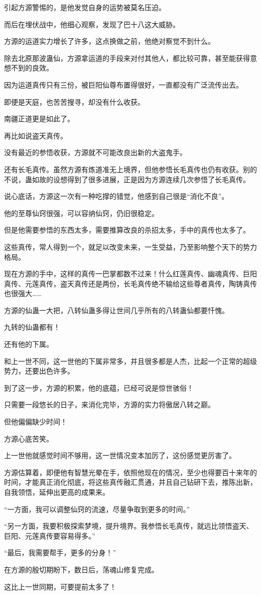 \begin{this_body}
引起方源警惕的，是他发觉自身的运势被莫名压迫。

而后在埋伏战中，他细心观察，发现了巴十八这大威胁。

方源的运道实力增长了许多，这点换做之前，他绝对察觉不到什么。

除去北原那波蛊仙，方源拿运道的手段来对付其他人，都比较可靠，甚至能获得意想不到的良效。

因为运道真传只有三份，被巨阳仙尊布置得很好，一直都没有广泛流传出去。

即便是天庭，也苦苦搜寻，却没有什么收获。

南疆正道更是如此了。

再比如说盗天真传。

没有最近的参悟收获，方源就不可能改良出新的大盗鬼手。

还有长毛真传。虽然方源有炼道准无上境界，但他参悟长毛真传也仍有收获。别的不说，蛊如故的设想得到了很多进展，正是因为方源连续几次参悟了长毛真传。

说心底话，方源这一次有一种吃撑的错觉，他感到自己很是“消化不良”。

他的至尊仙窍很强，可以容纳仙窍，仍旧很稳定。

但是他需要参悟的东西太多，需要推算改良的杀招太多，手中的真传也太多了。

这些真传，常人得到一个，就足以改变未来，一生受益，乃至影响整个天下的势力格局。

现在方源的手中，这样的真传一巴掌都数不过来！什么红莲真传、幽魂真传、巨阳真传、元莲真传，盗天真传还是两份，长毛真传绝不输给这些尊者真传，陶铸真传也很强大……

方源的仙蛊一大把，八转仙蛊多得让世间几乎所有的八转蛊仙都要忏愧。

九转的仙蛊都有！

还有他的下属。

和上一世不同，这一世他的下属非常多，并且很多都是人杰，比起一个正常的超级势力，还要出色许多。

到了这一步，方源的积累，他的底蕴，已经可说是惊世骇俗！

只需要一段悠长的日子，来消化完毕，方源的实力将傲居八转之巅。

但他偏偏缺少时间！

方源心底苦笑。

上一世他就感觉时间不够用，这一世情况变本加厉了，这份感觉更厉害了。

方源估算着，即便他有智慧光晕在手，依照他现在的情况，至少也得要百十来年的时间，才能真正消化彻底，将这些真传融汇贯通，并且自己钻研下去，推陈出新，自我领悟，延伸出更高的成果来。

“一方面，我可以调整仙窍的流速，尽量争取到更多的时间。”

“另一方面，我要积极探索梦境，提升境界。我参悟长毛真传，就远比领悟盗天、巨阳、元莲真传要容易得多。”

“最后，我需要帮手，更多的分身！”

在方源的殷切期盼下，数日后，荡魂山修复完成。

这比上一世同期，可要提前太多了！

\end{this_body}

